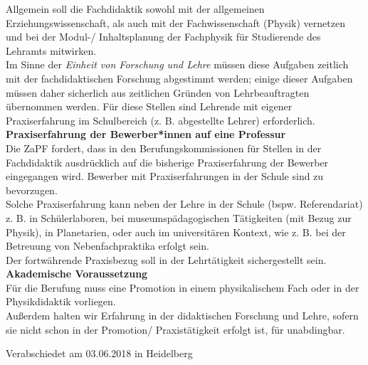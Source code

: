 \documentclass[DIV=calc]{scrartcl}
\begin{document}
Allgemein soll die Fachdidaktik sowohl mit der allgemeinen Erziehungswissenschaft, als auch mit der Fachwissenschaft (Physik) vernetzen und bei der Modul-/ Inhaltsplanung der Fachphysik für Studierende des Lehramts mitwirken.\\\newpage
Im Sinne der \textit{Einheit von Forschung und Lehre} müssen diese Aufgaben zeitlich mit der fachdidaktischen Forschung abgestimmt werden; einige dieser Aufgaben müssen daher sicherlich aus zeitlichen Gründen von Lehrbeauftragten übernommen werden. 
Für diese Stellen sind Lehrende mit eigener Praxiserfahrung im Schulbereich (z. B. abgestellte Lehrer) erforderlich.
\vspace{0.5\baselineskip}\\
\textbf{Praxiserfahrung der Bewerber*innen auf eine Professur}\\
Die ZaPF fordert, dass in den Berufungskommissionen für Stellen in der Fachdidaktik ausdrücklich auf die bisherige Praxiserfahrung der Bewerber eingegangen wird. Bewerber mit Praxiserfahrungen in der Schule sind zu bevorzugen.\\
Solche Praxiserfahrung kann neben der Lehre in der Schule (bspw. Referendariat) z. B. in Schülerlaboren, bei museumspädagogischen Tätigkeiten (mit Bezug zur Physik), in Planetarien, oder auch im universitären Kontext, wie z. B. bei der Betreuung von Nebenfachpraktika erfolgt sein.\\
Der fortwährende Praxisbezug soll in der Lehrtätigkeit sichergestellt sein.
\vspace{0.5\baselineskip}\\
\textbf{Akademische Voraussetzung}\\
Für die Berufung muss eine Promotion in einem physikalischem Fach oder in der Physikdidaktik vorliegen.\\
Außerdem halten wir Erfahrung in der didaktischen Forschung und Lehre, sofern sie nicht schon in der Promotion/ Praxistätigkeit erfolgt ist, für unabdingbar.
\vfill
    \begin{flushright}
        Verabschiedet am 03.06.2018 in Heidelberg
    \end{flushright}
\end{document}
